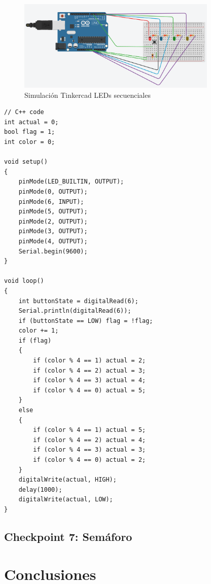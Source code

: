 \documentclass{article}
\begin{document}
\begin{figure}[H]
    \centering
    \includegraphics[width=0.85\textwidth]{./img/ckpt_6_0.png}
    \caption{Simulación Tinkercad LEDs secuenciales}
    \label{fig:leds_secuenciales}
\end{figure}

\begin{lstlisting}[style=cppstyle, caption={Código en C++ para el control de LEDs secuenciales.}, label={code:leds_secuenciales}]
// C++ code
int actual = 0;
bool flag = 1;
int color = 0;

void setup()
{
    pinMode(LED_BUILTIN, OUTPUT);
    pinMode(0, OUTPUT);
    pinMode(6, INPUT);
    pinMode(5, OUTPUT);
    pinMode(2, OUTPUT);
    pinMode(3, OUTPUT);
    pinMode(4, OUTPUT);
    Serial.begin(9600);
}

void loop()
{ 
    int buttonState = digitalRead(6);
    Serial.println(digitalRead(6));
    if (buttonState == LOW) flag = !flag;
    color += 1;
    if (flag)
    {
        if (color % 4 == 1) actual = 2;
        if (color % 4 == 2) actual = 3;
        if (color % 4 == 3) actual = 4;
        if (color % 4 == 0) actual = 5;
    } 
    else 
    {
        if (color % 4 == 1) actual = 5;
        if (color % 4 == 2) actual = 4;
        if (color % 4 == 3) actual = 3;
        if (color % 4 == 0) actual = 2;
    }
    digitalWrite(actual, HIGH);
    delay(1000);
    digitalWrite(actual, LOW);
}
\end{lstlisting}


\subsection{Checkpoint 7: Semáforo}

\section{Conclusiones}



\end{document}
